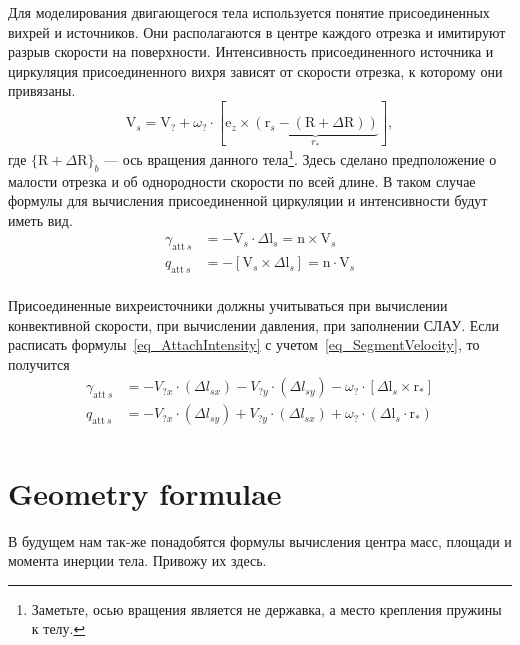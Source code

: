 \documentclass[14pt]{extreport}
\newcommand{\br}[1]{\boldsymbol{\mathrm{#1}}}
\renewcommand{\vec}[1]{\br{#1}}
\newcommand{\att}{\text{att}}
\begin{document}
Для моделирования двигающегося тела используется понятие присоединенных вихрей и источников. Они располагаются в центре каждого отрезка и имитируют разрыв скорости на поверхности. %
Интенсивность присоединенного источника и циркуляция присоединенного вихря зависят от скорости отрезка, к которому они привязаны.
\begin{equation}
\label{eq_SegmentVelocity}
\vec V_s = \vec V_? + \omega_? \cdot [\vec e_z \times \underbrace{(\vec r_s - (\vec R + \Delta \vec R))}_{r_*}],
\end{equation}
где $\lbrace\vec R + \Delta \vec R\rbrace_b$ --- ось вращения данного тела\footnote{Заметьте, осью вращения является не державка, а место крепления пружины к телу.}. Здесь сделано предположение о малости отрезка и об однородности скорости по всей длине. В таком случае формулы для вычисления присоединенной циркуляции и интенсивности будут иметь вид.
\begin{equation}
\label{eq_AttachIntensity}
\begin{split}
\gamma_{\att~s} &= -\vec V_s \cdot \Delta \vec l_s  = \vec n \times \vec V_s\\
q_{\att~s} &= -[\vec V_s \times \Delta \vec l_s] = \vec n \cdot \vec V_s\\
\end{split}
\end{equation}

Присоединенные вихреисточники должны учитываться при вычислении конвективной скорости, при вычислении давления, при заполнении СЛАУ.
Если расписать формулы~\ref{eq_AttachIntensity} с учетом~\ref{eq_SegmentVelocity}, то получится
\begin{equation}
\label{eq_AttachIntensityLong}
\begin{split}
\gamma_{\att~s} &=
-V_{?x} \cdot (\Delta l_{sx}) - V_{?y} \cdot (\Delta l_{sy}) - \omega_? \cdot [\Delta \vec l_s \times \vec r_*]\\
q_{\att~s} &=
-V_{?x} \cdot (\Delta l_{sy}) + V_{?y} \cdot (\Delta l_{sx}) + \omega_? \cdot (\Delta \vec l_s \cdot \vec r_*)\\
\end{split}
\end{equation}

\section{Geometry formulae}
В будущем нам так-же понадобятся формулы вычисления центра масс, площади и момента инерции тела. Привожу их здесь.
\end{document}
